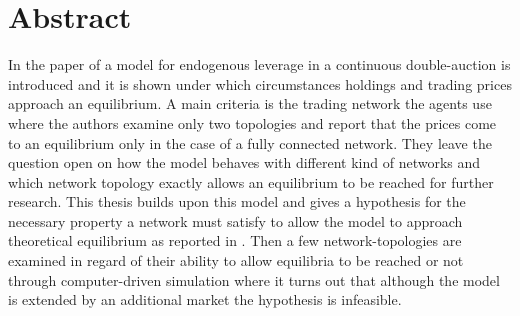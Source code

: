 \documentclass[Bachelorarbeit.tex]{subfiles}
\begin{document}
\chapter*{Abstract}
In the paper of \cite{Breuer2015} a model for endogenous leverage in a continuous double-auction is introduced and it is shown under which circumstances holdings and trading prices approach an equilibrium. A main criteria is the trading network the agents use where the authors examine only two topologies and report that the prices come to an equilibrium only in the case of a fully connected network. They leave the question open on how the model behaves with different kind of networks and which network topology exactly allows an equilibrium to be reached  for further research. This thesis builds upon this model and gives a hypothesis for the necessary property a network must satisfy to allow the model to approach theoretical equilibrium as reported in \cite{Breuer2015}. Then a few network-topologies are examined in regard of their ability to allow equilibria to be reached or not through computer-driven simulation where it turns out that although the model is extended by an additional market the hypothesis is infeasible.
\end{document}

